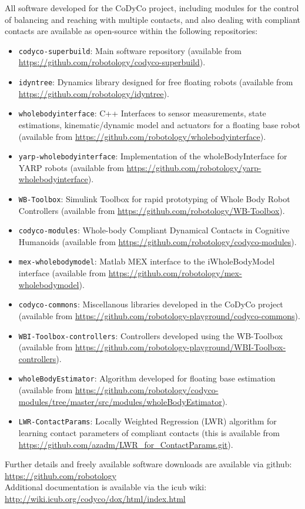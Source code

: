 \documentclass[12pt,a4paper,twoside]{article}
\begin{document}
All software developed for the CoDyCo project, including modules for the
control of balancing and reaching with multiple contacts, and also dealing
with compliant contacts are available as open-source within the following
repositories:
\begin{itemize}
\item \texttt{codyco-superbuild}: Main software repository (available from
  \url{https://github.com/robotology/codyco-superbuild}). 
\item \texttt{idyntree}: Dynamics library designed for free floating robots
  (available from \url{https://github.com/robotology/idyntree}).
\item \texttt{wholebodyinterface}: C++ Interfaces to sensor measurements,
  state estimations, kinematic/dynamic model and actuators for a floating base
  robot (available from
  \url{https://github.com/robotology/wholebodyinterface}).
\item \texttt{yarp-wholebodyinterface}: Implementation of the
  wholeBodyInterface for YARP robots (available from
  \url{https://github.com/robotology/yarp-wholebodyinterface}).
\item \texttt{WB-Toolbox}: Simulink Toolbox for rapid prototyping of Whole
  Body Robot Controllers (available from
  \url{https://github.com/robotology/WB-Toolbox}).
\item \texttt{codyco-modules}: Whole-body Compliant Dynamical Contacts in
  Cognitive Humanoids (available from
  \url{https://github.com/robotology/codyco-modules}).
\item \texttt{mex-wholebodymodel}: Matlab MEX interface to the iWholeBodyModel
  interface (available from
  \url{https://github.com/robotology/mex-wholebodymodel}).
\item \texttt{codyco-commons}: Miscellanous libraries developed in the CoDyCo
  project (available from
  \url{https://github.com/robotology-playground/codyco-commons}).
\item \texttt{WBI-Toolbox-controllers}: Controllers developed using the
  WB-Toolbox (available from
  \url{https://github.com/robotology-playground/WBI-Toolbox-controllers}).
\item \texttt{wholeBodyEstimator}: Algorithm developed for floating base
  estimation (available from
  \url{https://github.com/robotology/codyco-modules/tree/master/src/modules/wholeBodyEstimator}).
\item \texttt{LWR-ContactParams}: Locally Weighted Regression (LWR) algorithm
  for learning contact parameters of compliant contacts (this is available
  from \url{https://github.com/azadm/LWR_for_ContactParams.git}).
\end{itemize}

Further details and freely available software downloads are available via
github: \\ \url{https://github.com/robotology} \\

Additional documentation is available via the icub wiki: \\
\url{http://wiki.icub.org/codyco/dox/html/index.html} \\
\end{document}
